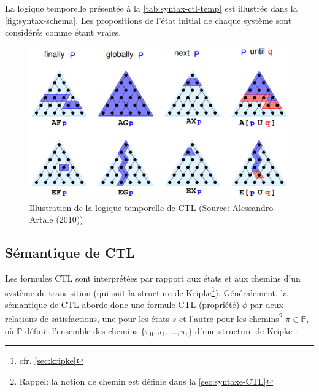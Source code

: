 \documentclass[runningheads,a4paper,10pt]{llncs}
\begin{document}
La logique temporelle présentée à la \autoref{tab:syntax-ctl-temp} est illustrée dans la \autoref{fig:syntax-schema}. Les propositions de l'état initial de chaque système sont considérés comme étant vraies. 

\begin{figure}
  \centering
   \includegraphics[scale=0.43]{figures/syntax-schema.png}
   \caption[Caption for LOF]{Illustration de la logique temporelle de CTL (Source: Alessandro Artale (2010))\protect\footnotemark}
   \label{fig:syntax-schema}
\end{figure}






\subsection{Sémantique de CTL} \label{sec:sem-CTL}
Les formules CTL sont interprétées par rapport aux états et aux chemins d'un système de transisition (qui suit la structure de Kripke\footnote{cfr. \autoref{sec:kripke}}). Généralement, la sémantique de CTL aborde donc une formule CTL (propriété) $\phi$ par deux relations de satisfactions, une pour les états $s$ et l'autre pour les chemins\footnote{Rappel: la notion de chemin est définie dans la \autoref{sec:syntaxe-CTL}} $\pi \in \mathbb{P}$, où $\mathbb{P}$ définit l'ensemble des chemins $\{\pi_{0}, \pi_{1}, \dots, \pi_{i}\}$ d'une structure de Kripke : 
\end{document}
